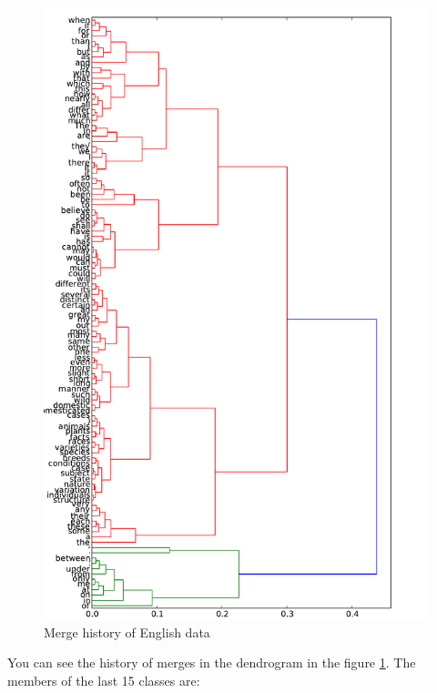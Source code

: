 \documentclass[12pt,a4paper]{article}
\begin{document}
\begin{figure}[h!]
  \centering
  \includegraphics[width=\textwidth]{dendrogram_en}
  \caption{Merge history of English data}
  \label{dendrogram_en}
\end{figure}

You can see the history of merges in the dendrogram in the figure \ref{dendrogram_en}.
The members of the last 15 classes are:
\end{document}
